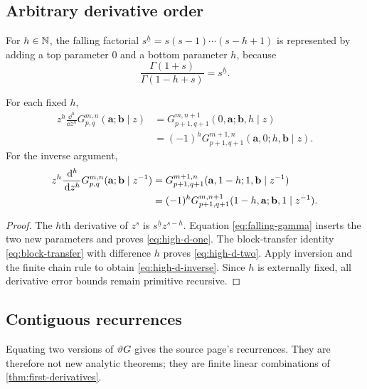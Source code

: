 \subsection{Arbitrary derivative order}

For $h\in\mathbb N$, the falling factorial
$s^{\underline h}=s(s-1)\cdots(s-h+1)$ is represented by adding a top parameter
$0$ and a bottom parameter $h$, because
\begin{equation}\label{eq:falling-gamma}
 \frac{\Gamma(1+s)}{\Gamma(1-h+s)}=s^{\underline h}.
\end{equation}

\begin{theorem}\label{thm:higher-derivatives}
For each fixed $h$,
\begin{align}
z^h\frac{\dd^h}{\dd z^h}G_{p,q}^{m,n}(\mathbf a;\mathbf b\mid z)
&=G_{p+1,q+1}^{m,n+1}(0,\mathbf a;\mathbf b,h\mid z)\label{eq:high-d-one}\\
&=(-1)^hG_{p+1,q+1}^{m+1,n}(\mathbf a,0;h,\mathbf b\mid z).
\label{eq:high-d-two}
\end{align}
For the inverse argument,
\begin{align}
z^h\frac{\,\mathrm d^h}{\,\mathrm d z^h}G_{p,q}^{m,n}(\mathbf a;\mathbf b\mid z^{-1})
&=G_{p+1,q+1}^{m+1,n}(\mathbf a,1-h;1,\mathbf b\mid z^{-1})\notag\\
&=(-1)^hG_{p+1,q+1}^{m,n+1}(1-h,\mathbf a;\mathbf b,1\mid z^{-1}).
\label{eq:high-d-inverse}
\end{align}
\end{theorem}
\begin{proof}
The $h$th derivative of $z^s$ is $s^{\underline h}z^{s-h}$.
Equation \eqref{eq:falling-gamma} inserts the two new parameters and proves
\eqref{eq:high-d-one}.  The block-transfer identity
\eqref{eq:block-transfer} with difference $h$ proves
\eqref{eq:high-d-two}.  Apply inversion and the finite chain rule to obtain
\eqref{eq:high-d-inverse}.  Since $h$ is externally fixed, all derivative
error bounds remain primitive recursive.
\end{proof}

\subsection{Contiguous recurrences}

Equating two versions of $\vartheta G$ gives the source page's recurrences.
They are therefore not new analytic theorems; they are finite linear
combinations of \cref{thm:first-derivatives}.


